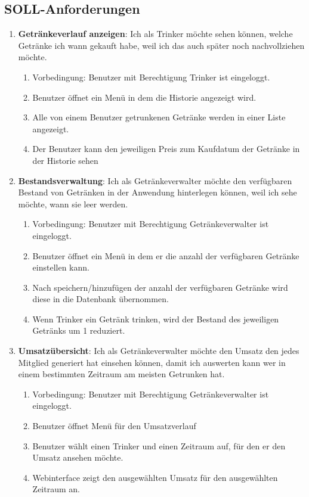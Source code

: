 \documentclass[conference,a4paper]{cs-techrep}
\begin{document}
\subsection{SOLL-Anforderungen}

\begin{enumerate}[{USS}1]

\item \textbf{Getränkeverlauf anzeigen}: Ich als Trinker möchte sehen können, welche Getränke ich wann gekauft habe, weil ich das auch später noch nachvollziehen möchte.
\begin{enumerate}
	\item Vorbedingung: Benutzer mit Berechtigung Trinker ist eingeloggt.
	\item Benutzer öffnet ein Menü in dem die Historie angezeigt wird.
	\item Alle von einem Benutzer getrunkenen Getränke werden in einer Liste angezeigt.
	\item Der Benutzer kann den jeweiligen Preis zum Kaufdatum der Getränke in der Historie sehen
\end{enumerate}

\item \textbf{Bestandsverwaltung}: Ich als Getränkeverwalter möchte den verfügbaren Bestand von Getränken in der Anwendung hinterlegen können, weil ich sehe möchte, wann sie leer werden.
\begin{enumerate}
	\item Vorbedingung: Benutzer mit Berechtigung Getränkeverwalter ist eingeloggt.
	\item Benutzer öffnet ein Menü in dem er die anzahl der verfügbaren Getränke einstellen kann.
	\item Nach speichern/hinzufügen der anzahl der verfügbaren Getränke wird diese in die Datenbank übernommen.
	\item Wenn Trinker ein Getränk trinken, wird der Bestand des jeweiligen Getränks um 1 reduziert.
\end{enumerate}

\item \textbf{Umsatzübersicht}: Ich als Getränkeverwalter möchte den Umsatz den jedes Mitglied generiert hat einsehen können, damit ich auswerten kann wer in einem bestimmten Zeitraum am meisten Getrunken hat.
\begin{enumerate}
	\item Vorbedingung: Benutzer mit Berechtigung Getränkeverwalter ist eingeloggt.
	\item Benutzer öffnet Menü für den Umsatzverlauf
	\item Benutzer wählt einen Trinker und einen Zeitraum auf, für den er den Umsatz ansehen möchte.
	\item Webinterface zeigt den ausgewählten Umsatz für den ausgewählten Zeitraum an.
\end{enumerate}

\end{enumerate}
\end{document}
